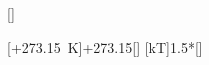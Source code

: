 [\degreeCelsius]

[\vartheta+\SI{273.15}{\kelvin}]{\thWX+273.15}[\kelvin]
[kT]{1.5*\nckX*\TWX}[\joule]
